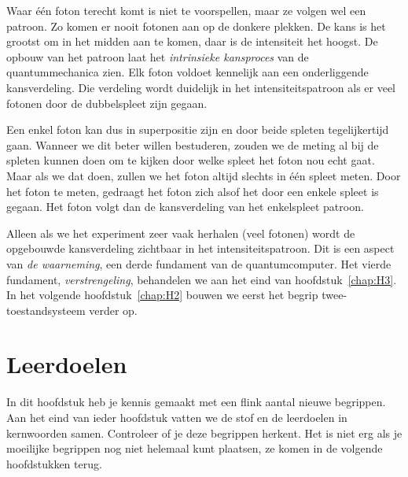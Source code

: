 \documentclass[../../main.tex]{subfiles}
\begin{document}
Waar \'e\'en foton terecht komt is niet te voorspellen, maar ze volgen wel een patroon. Zo komen  er nooit fotonen aan op de donkere plekken. De kans is het grootst om in het midden aan te komen, daar is de intensiteit het hoogst. De opbouw van het patroon laat het \textit{intrinsieke kansproces} van de quantummechanica zien. Elk foton voldoet kennelijk aan een onderliggende kansverdeling. Die verdeling wordt duidelijk in het intensiteitspatroon als er veel fotonen door de dubbelspleet zijn gegaan.

Een enkel foton kan dus in superpositie zijn en door beide spleten tegelijkertijd gaan. Wanneer we dit beter willen bestuderen, zouden we de meting al bij de spleten kunnen doen om te kijken door welke spleet het foton nou echt gaat. Maar als we dat doen, zullen we het foton altijd slechts in \'e\'en spleet meten. Door het foton te meten, gedraagt het foton zich alsof het door een enkele spleet is gegaan. Het foton volgt dan de kansverdeling van het enkelspleet patroon.

Alleen als we het experiment zeer vaak herhalen (veel fotonen) wordt de opgebouwde kansverdeling zichtbaar in het intensiteitspatroon. Dit is een aspect van \textit{de waarneming}, een derde fundament van de quantumcomputer. Het vierde fundament, \textit{verstrengeling}, behandelen we aan het eind van hoofdstuk~\ref{chap:H3}. In het volgende hoofdstuk~\ref{chap:H2} bouwen we eerst het begrip twee-toestandsysteem verder op. 

\section{Leerdoelen}
In dit hoofdstuk heb je kennis gemaakt met een flink aantal nieuwe begrippen. Aan het eind van ieder hoofdstuk vatten we de stof en de leerdoelen in kernwoorden samen. Controleer of je deze begrippen herkent. Het is niet erg als je moeilijke begrippen nog niet helemaal kunt plaatsen, ze komen in de volgende hoofdstukken terug.
\end{document}
